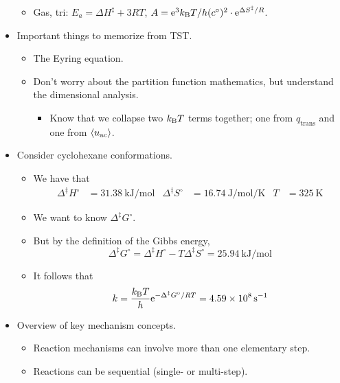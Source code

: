 \documentclass[../notes.tex]{subfiles}
\begin{document}
\begin{itemize}
\begin{itemize}
        \item Gas, tri: $E_a=\Delta H^\ddagger+3RT$, $A=\e[3]\kB T/h(c^\circ)^2\cdot\e[\Delta S^\ddagger/R]$.
    \end{itemize}
    \item Important things to memorize from TST.
    \begin{itemize}
        \item The Eyring equation.
        \item Don't worry about the partition function mathematics, but understand the dimensional analysis.
        \begin{itemize}
            \item Know that we collapse two $\kB T$ terms together; one from $q_\text{trans}$ and one from $\prb{u_\text{ac}}$.
        \end{itemize}
    \end{itemize}
    \item Consider cyclohexane conformations.
    \begin{itemize}
        \item We have that
        \begin{align*}
            \Delta^\ddagger H^\circ &= \SI{31.38}{\kilo\joule\per\mole}&
            \Delta^\ddagger S^\circ &= \SI{16.74}{\joule\per\mole\per\kelvin}&
            T &= \SI{325}{\kelvin}
        \end{align*}
        \item We want to know $\Delta^\ddagger G^\circ$.
        \item But by the definition of the Gibbs energy,
        \begin{equation*}
            \Delta^\ddagger G^\circ = \Delta^\ddagger H^\circ-T\Delta^\ddagger S^\circ
            = \SI{25.94}{\kilo\joule\per\mole}
        \end{equation*}
        \item It follows that
        \begin{equation*}
            k = \frac{\kB T}{h}\e[-\Delta^\ddagger G^\circ/RT]
            = \SI{4.59e8}{\per\second}
        \end{equation*}
    \end{itemize}
    \item Overview of key mechanism concepts.
    \begin{itemize}
        \item Reaction mechanisms can involve more than one elementary step.
        \item Reactions can be sequential (single- or multi-step).

\end{itemize}
\end{itemize}
\end{document}
